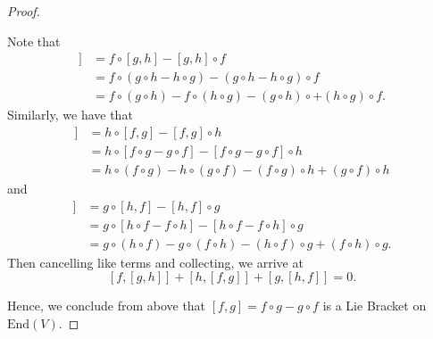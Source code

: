 \documentclass[a4paper]{article}
\begin{document}
\begin{proof}
\begin{enumerate}
        Note that 
        \begin{align*}
            [f,[g,h]]  &= f \circ [g,h] - [g,h] \circ f \\
                       &= f \circ (g \circ h - h \circ g) - (g \circ h - h \circ g) \circ f \\
                       &= f \circ (g \circ h) - f \circ (h \circ g) - (g \circ h) \circ + (h \circ g) \circ f.
        \end{align*}
        Similarly, we have that 
        \begin{align*}
            [h,[f,g]] &= h \circ [f,g] - [f,g] \circ h \\
                      &= h \circ [f \circ g - g \circ f] - [f \circ g  - g \circ f  ] \circ  h \\
                      &= h \circ (f \circ g) - h \circ (g \circ f) - (f \circ g) \circ h  + (g \circ f) \circ h
        \end{align*}
        and
        \begin{align*}
            [g, [h,f]] &= g \circ [h,f] - [h,f] \circ g  \\
                       &= g \circ [h \circ f - f \circ h] - [h \circ f - f \circ h] \circ g \\
                       &= g \circ (h \circ f) - g \circ (f \circ h) - (h \circ f) \circ g + (f \circ h) \circ g.
        \end{align*}
        Then cancelling like terms and collecting, we arrive at 
        \[  [f,[g,h]] + [h,[f,g]] + [g,[h,f]]  = 0. \]
\end{enumerate}
Hence, we conclude from above that \( [f,g] = f \circ g - g \circ f \) is a Lie Bracket on \( \text{End}(V)  \).
\end{proof}
\end{document}
